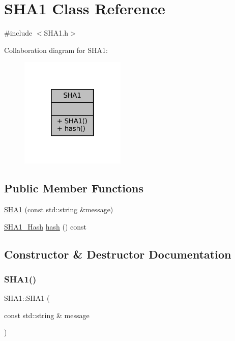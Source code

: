 \hypertarget{class_s_h_a1}{}\section{S\+H\+A1 Class Reference}
\label{class_s_h_a1}


{\ttfamily \#include $<$S\+H\+A1.\+h$>$}



Collaboration diagram for S\+H\+A1\+:
\nopagebreak
\begin{figure}[H]
\begin{center}
\leavevmode
\includegraphics[width=142pt]{class_s_h_a1__coll__graph}
\end{center}
\end{figure}
\subsection*{Public Member Functions}
\begin{DoxyCompactItemize}
\item 
\mbox{\hyperlink{class_s_h_a1_aa77feb1aa6bfae6a9f1989bcde710455}{S\+H\+A1}} (const std\+::string \&message)
\item 
\mbox{\hyperlink{struct_s_h_a1___hash}{S\+H\+A1\+\_\+\+Hash}} \mbox{\hyperlink{class_s_h_a1_a75d7ba7c491c477ec43a842668cb7f0b}{hash}} () const
\end{DoxyCompactItemize}


\subsection{Constructor \& Destructor Documentation}
\mbox{\label{class_s_h_a1_aa77feb1aa6bfae6a9f1989bcde710455}} 
\subsubsection{\texorpdfstring{S\+H\+A1()}{SHA1()}}
{\footnotesize\ttfamily S\+H\+A1\+::\+S\+H\+A1 (\begin{DoxyParamCaption}\item[{const std\+::string \&}]{message }\end{DoxyParamCaption})\hspace{0.3cm}{\ttfamily [explicit]}}



